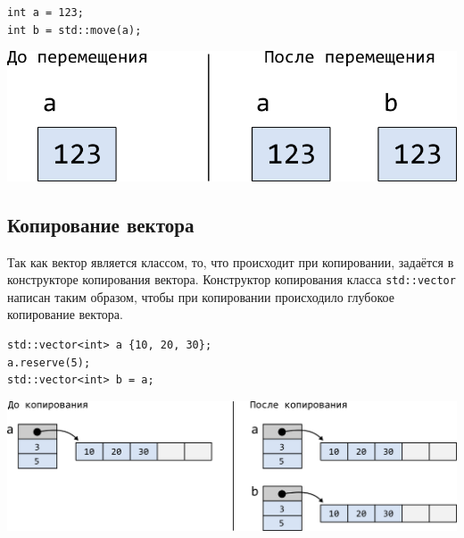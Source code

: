 \documentclass{article}
\begin{document}
\noindent\begin{minipage}{.30\textwidth}
\begin{lstlisting}
int a = 123;
int b = std::move(a);
\end{lstlisting}
\end{minipage}\hfill
\begin{minipage}{.60\textwidth}
\includegraphics[scale=1]{../images/move_int.png}
\end{minipage}




\subsection*{Копирование вектора}
Так как вектор является классом, то, что происходит при копировании, задаётся в конструкторе копирования вектора. Конструктор копирования класса \texttt{std::vector} написан таким образом, чтобы при копировании происходило глубокое копирование вектора.
\begin{lstlisting}
std::vector<int> a {10, 20, 30};
a.reserve(5);
std::vector<int> b = a;
\end{lstlisting}

\begin{center}
\includegraphics[scale=1]{../images/copy_vector.png}
\end{center}
\end{document}
